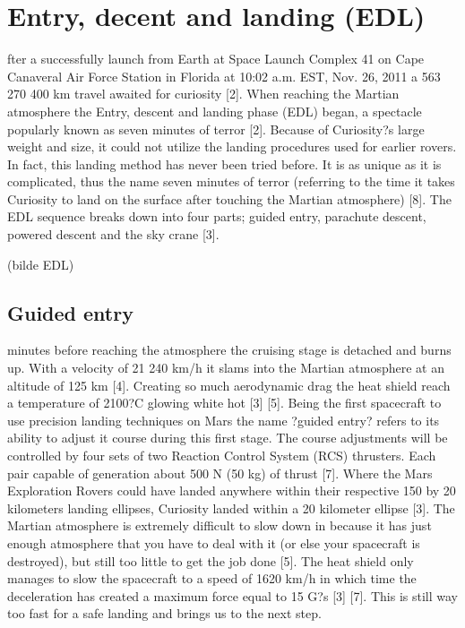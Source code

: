 \section*{Entry, decent and landing (EDL)}
fter a successfully launch from Earth at Space Launch Complex 41 on Cape Canaveral Air Force Station in Florida at 10:02 a.m. EST, Nov. 26, 2011 a 563 270 400 km travel awaited for curiosity \cite{MissionTimeline} [2]. When reaching the Martian atmosphere the Entry, descent and landing phase (EDL) began, a spectacle popularly known as seven minutes of terror [2]. Because of Curiosity?s large weight and size, it could not utilize the landing procedures used for earlier rovers. In fact, this landing method has never been tried before. It is as unique as it is complicated, thus the name seven minutes of terror (referring to the time it takes Curiosity to land on the surface after touching the Martian atmosphere) [8]. 
The EDL sequence breaks down into four parts; guided entry, parachute descent, powered descent and the sky crane [3].

(bilde EDL)

\subsection*{Guided entry}
 minutes before reaching the atmosphere the cruising stage is detached and burns up.
With a velocity of 21 240 km/h it slams into the Martian atmosphere at an altitude of 125 km [4]. Creating so much aerodynamic drag the heat shield reach a temperature of 2100?C glowing white hot [3] [5]. Being the first spacecraft to use precision landing techniques on Mars the name ?guided entry? refers to its ability to adjust it course during this first stage. The course adjustments will be controlled by four sets of two Reaction Control System (RCS) thrusters. Each pair capable of generation about 500 N (50 kg) of thrust [7]. Where the Mars Exploration Rovers could have landed anywhere within their respective 150 by 20 kilometers landing ellipses, Curiosity landed within a 20 kilometer ellipse [3].
The Martian atmosphere is extremely difficult to slow down in because it has just enough atmosphere that you have to deal with it (or else your spacecraft is destroyed), but still too little to get the job done [5]. The heat shield only manages to slow the spacecraft to a speed of 1620 km/h in which time the deceleration has created a maximum force equal to 15 G?s [3] [7]. This is still way too fast for a safe landing and brings us to the next step.

